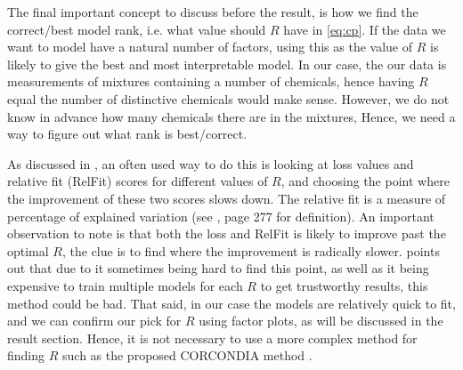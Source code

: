 The final important concept to discuss before the result, is how we find the correct/best model rank, i.e. what value should $R$ have in \eqref{eq:cp}.
If the data we want to model have a natural number of factors, using this as the value of $R$ is likely to give the best and most interpretable model.
In our case, the our data is measurements of mixtures containing a number of chemicals, hence having $R$ equal the number of distinctive chemicals would make sense.
However, we do not know in advance how many chemicals there are in the mixtures,
Hence, we need a way to figure out what rank is best/correct.

As discussed in \textcite{corcondia}, an often used way to do this is looking at loss values and relative fit (RelFit) scores for different values of $R$, and choosing the point where the improvement of these two scores slows down.
The relative fit is a measure of percentage of explained variation (see \textcite{corcondia}, page 277 for definition).
An important observation to note is that both the loss and RelFit is likely to improve past the optimal $R$, the clue is to find where the improvement is radically slower.
\textcite{corcondia} points out that due to it sometimes being hard to find this point, as well as it being expensive to train multiple models for each $R$ to get trustworthy results, this method could be bad.
That said, in our case the models are relatively quick to fit, and we can confirm our pick for $R$ using factor plots, as will be discussed in the result section.
Hence, it is not necessary to use a more complex method for finding $R$ such as the proposed CORCONDIA method \cite{corcondia}.


